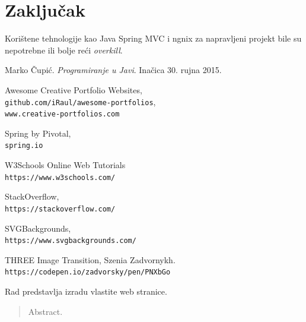 \documentclass[times, utf8, zavrsni, numeric]{fer}
\begin{document}
\chapter{Zaključak}
Korištene tehnologije kao Java Spring MVC i ngnix za napravljeni projekt bile su nepotrebne ili bolje reći \textit{overkill}\footnotemark.



\begin{thebibliography}{9}
				Marko Čupić.
				\textit{Programiranje u Javi}.
				Inačica 30. rujna 2015.

				Awesome Creative Portfolio Websites,
				\\\texttt{github.com/iRaul/awesome-portfolios},
				\\\texttt{www.creative-portfolios.com}

				Spring by Pivotal,
				\\\texttt{spring.io}

				W3Schools Online Web Tutorials
				\\\texttt{https://www.w3schools.com/}

				StackOverflow,
				\\\texttt{https://stackoverflow.com/}

				SVGBackgrounds,
				\\\texttt{https://www.svgbackgrounds.com/}

				THREE Image Transition,
				Szenia Zadvornykh.
				\texttt{https://codepen.io/zadvorsky/pen/PNXbGo}

\bibitem{}
\bibitem{}
\bibitem{}
\bibitem{}
\bibitem{}
\bibitem{}
\end{thebibliography}

\begin{sazetak}
\qquad Rad predstavlja izradu vlastite web stranice.

\end{sazetak}

\begin{abstract}
Abstract.

\end{abstract}
\end{document}

